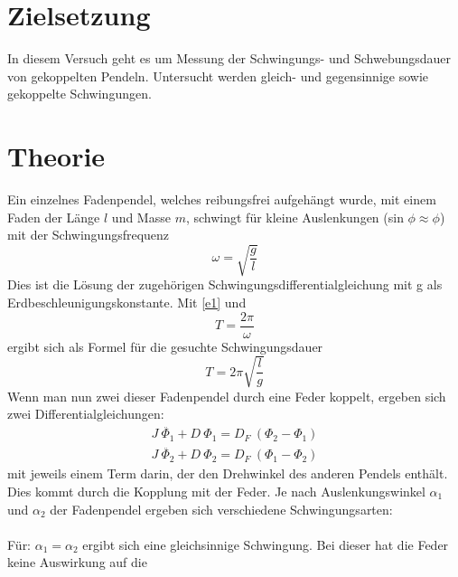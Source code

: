 \maketitle
\tableofcontents
\newpage

\section{Zielsetzung}
In diesem Versuch geht es um Messung der Schwingungs- und Schwebungsdauer von gekoppelten Pendeln.
Untersucht werden gleich- und gegensinnige sowie gekoppelte Schwingungen.
\section{Theorie}
Ein einzelnes Fadenpendel, welches reibungsfrei aufgehängt wurde, mit einem Faden der Länge $\textit{l}$ und Masse $\textit{m}$,
schwingt für kleine Auslenkungen (sin $\phi \approx \phi$) mit der Schwingungsfrequenz
\begin{equation}
  \omega = \sqrt{\frac{g}{l}}
  \label{e1}
\end{equation}
Dies ist die Lösung der zugehörigen Schwingungsdifferentialgleichung mit g als Erdbeschleunigungskonstante. Mit \eqref{e1} und
\begin{equation*}
  \textit{T} = \frac{2\pi}{\omega}
\end{equation*}
ergibt sich als Formel für die gesuchte Schwingungsdauer
\begin{equation}
  \textit{T} = 2\pi \sqrt{\frac{l}{g}}
  \label{e2}
\end{equation}
Wenn man nun zwei dieser Fadenpendel durch eine Feder koppelt, ergeben sich zwei Differentialgleichungen:
\begin{equation}
  \begin{split}
    J \ \ddot{\Phi_{1}} + D \ \Phi_{1} = D_{F} \ (\Phi_{2} - \Phi_{1}) \\
    J \ \ddot{\Phi_{2}} + D \ \Phi_{2} = D_{F} \ (\Phi_{1} - \Phi_{2})
  \end{split}
\end{equation}
mit jeweils einem Term darin,
der den Drehwinkel des anderen Pendels enthält. Dies kommt durch die Kopplung mit der Feder. Je nach Auslenkungswinkel $\alpha_{1}$
und $\alpha_{2}$ der Fadenpendel ergeben sich verschiedene Schwingungsarten:
\\
\\
Für: $\alpha_{1} = \alpha_{2}$ ergibt sich eine gleichsinnige Schwingung. Bei dieser hat die Feder keine Auswirkung auf die
